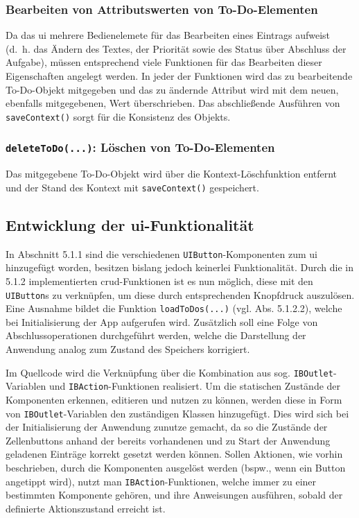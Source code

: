 \subsubsection{Bearbeiten von Attributswerten von To-Do-Elementen}
Da das \ac{ui} mehrere Bedienelemete für das Bearbeiten eines Eintrags aufweist (d.\ h. das Ändern des Textes, der Priorität sowie des Status über Abschluss der Aufgabe), müssen entsprechend viele Funktionen für das Bearbeiten dieser Eigenschaften angelegt werden. In jeder der Funktionen wird das zu bearbeitende To-Do-Objekt mitgegeben und das zu ändernde Attribut wird mit dem neuen, ebenfalls mitgegebenen, Wert überschrieben. Das abschließende Ausführen von \texttt{saveContext()} sorgt für die Konsistenz des Objekts.

\subsubsection{\texttt{deleteToDo(...)}: Löschen von To-Do-Elementen}
Das mitgegebene To-Do-Objekt wird über die Kontext-Löschfunktion entfernt und der Stand des Kontext mit \texttt{saveContext()} gespeichert.

\subsection{Entwicklung der \ac{ui}-Funktionalität}
In Abschnitt 5.1.1 sind die verschiedenen \texttt{UIButton}-Komponenten zum \ac{ui} hinzugefügt worden, besitzen bislang jedoch keinerlei Funktionalität. Durch die in 5.1.2 implementierten \ac{crud}-Funktionen ist es nun möglich, diese mit den \texttt{UIButton}s zu verknüpfen, um diese durch entsprechenden Knopfdruck auszulösen. Eine Ausnahme bildet die Funktion \texttt{loadToDos(...)} (vgl. Abs. 5.1.2.2), welche bei Initialisierung der App aufgerufen wird. Zusätzlich soll eine Folge von Abschlussoperationen durchgeführt werden, welche die Darstellung der Anwendung analog zum Zustand des Speichers korrigiert.

Im Quellcode wird die Verknüpfung über die Kombination aus sog. \texttt{IBOutlet}-Variablen und \texttt{IBAction}-Funktionen realisiert. Um die statischen Zustände der Komponenten erkennen, editieren und nutzen zu können, werden diese in Form von \texttt{IBOutlet}-Variablen den zuständigen Klassen hinzugefügt. Dies wird sich bei der Initialisierung der Anwendung zunutze gemacht, da so die Zustände der Zellenbuttons anhand der bereits vorhandenen und zu Start der Anwendung geladenen Einträge korrekt gesetzt werden können. Sollen Aktionen, wie vorhin beschrieben, durch die Komponenten ausgelöst werden (bspw., wenn ein Button angetippt wird), nutzt man \texttt{IBAction}-Funktionen, welche immer zu einer bestimmten Komponente gehören, und ihre Anweisungen ausführen, sobald der definierte Aktionszustand erreicht ist.


